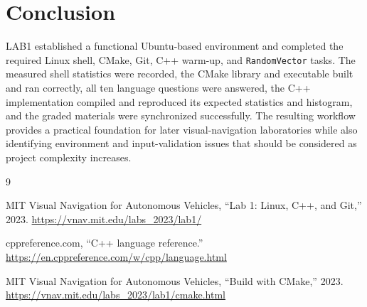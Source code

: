 \documentclass[11pt,a4paper]{article}
\begin{document}
\section{Conclusion}

LAB1 established a functional Ubuntu-based environment and completed the required Linux shell, CMake, Git, C++ warm-up, and \texttt{RandomVector} tasks. The measured shell statistics were recorded, the CMake library and executable built and ran correctly, all ten language questions were answered, the C++ implementation compiled and reproduced its expected statistics and histogram, and the graded materials were synchronized successfully. The resulting workflow provides a practical foundation for later visual-navigation laboratories while also identifying environment and input-validation issues that should be considered as project complexity increases.

{\small
\begin{thebibliography}{9}
\setlength{\itemsep}{0.25em}

MIT Visual Navigation for Autonomous Vehicles,
``Lab 1: Linux, C++, and Git,'' 2023.
\url{https://vnav.mit.edu/labs_2023/lab1/}

cppreference.com,
``C++ language reference.''
\url{https://en.cppreference.com/w/cpp/language.html}

MIT Visual Navigation for Autonomous Vehicles,
``Build with CMake,'' 2023.
\url{https://vnav.mit.edu/labs_2023/lab1/cmake.html}

\end{thebibliography}
}
\end{document}
